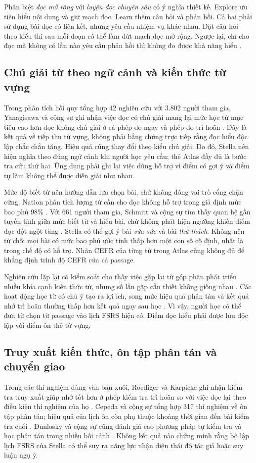 \documentclass[conference,10pt]{IEEEtran}
\begin{document}
Phân biệt \emph{đọc mở rộng} với \emph{luyện đọc chuyên sâu} có ý nghĩa thiết kế. Explore ưu tiên hiểu nội dung và giữ mạch đọc. Learn thêm câu hỏi và phản hồi. Cả hai phải sử dụng bài đọc có liên kết, nhưng yêu cầu nhiệm vụ khác nhau. Đặt câu hỏi theo kiểu thi sau mỗi đoạn có thể làm đứt mạch đọc mở rộng. Ngược lại, chỉ cho đọc mà không có lần nào yêu cầu phản hồi thì không đo được khả năng hiểu \cite{grabe2004,nation2007}.

\subsection{Chú giải từ theo ngữ cảnh và kiến thức từ vựng}
Trong phân tích hồi quy tổng hợp 42 nghiên cứu với 3.802 người tham gia, Yanagisawa và cộng sự ghi nhận việc đọc có chú giải mang lại mức học từ mục tiêu cao hơn đọc không chú giải ở cả phép đo ngay và phép đo trì hoãn \cite{yanagisawa2020}. Đây là kết quả về tiếp thu từ vựng, không phải bằng chứng trực tiếp rằng đọc hiểu độc lập chắc chắn tăng. Hiệu quả cũng thay đổi theo kiểu chú giải. Do đó, Stella nên hiện nghĩa theo đúng ngữ cảnh khi người học yêu cầu; thẻ Atlas đầy đủ là bước tra cứu thứ hai. Ứng dụng phải ghi lại việc dùng hỗ trợ vì điểm có gợi ý và điểm tự làm không thể được diễn giải như nhau.

Mức độ biết từ nên hướng dẫn lựa chọn bài, chứ không đóng vai trò cổng chặn cứng. Nation phân tích lượng từ cần cho đọc không hỗ trợ trong giả định mức bao phủ 98\% \cite{nation2006}. Với 661 người tham gia, Schmitt và cộng sự tìm thấy quan hệ gần tuyến tính giữa mức biết từ và hiểu bài, chứ không phát hiện ngưỡng khiến điểm đọc đột ngột tăng \cite{schmitt2011}. Stella có thể gợi ý bài \emph{vừa sức} và bài \emph{thử thách}. Không nên từ chối mọi bài có mức bao phủ ước tính thấp hơn một con số cố định, nhất là trong chế độ có hỗ trợ. Nhãn CEFR của từng từ trong Atlas cũng không đủ để khẳng định trình độ CEFR của cả passage.

Nghiên cứu lặp lại có kiểm soát cho thấy việc gặp lại từ góp phần phát triển nhiều khía cạnh kiến thức từ, nhưng số lần gặp cần thiết không giống nhau \cite{webb2007}. Các hoạt động học từ có chủ ý tạo ra lợi ích, song mức hiệu quả phân tán và kết quả nhớ trì hoãn thường thấp hơn kết quả ngay sau học \cite{webb2020intentional}. Vì vậy, người học có thể đưa từ chọn từ passage vào lịch FSRS hiện có. Điểm đọc hiểu phải được lưu độc lập với điểm ôn thẻ từ vựng.

\subsection{Truy xuất kiến thức, ôn tập phân tán và chuyển giao}
Trong các thí nghiệm dùng văn bản xuôi, Roediger và Karpicke ghi nhận kiểm tra truy xuất giúp nhớ tốt hơn ở phép kiểm tra trì hoãn so với việc đọc lại theo điều kiện thí nghiệm của họ \cite{roediger2006}. Cepeda và cộng sự tổng hợp 317 thí nghiệm về ôn tập phân tán; hiệu quả của lịch ôn còn phụ thuộc khoảng thời gian đến bài kiểm tra cuối \cite{cepeda2006}. Dunlosky và cộng sự cũng đánh giá cao phương pháp tự kiểm tra và học phân tán trong nhiều bối cảnh \cite{dunlosky2013}. Không kết quả nào chứng minh rằng bộ lập lịch FSRS của Stella có thể suy ra năng lực nhận diện thái độ tác giả hoặc suy luận ngụ ý.
\end{document}
